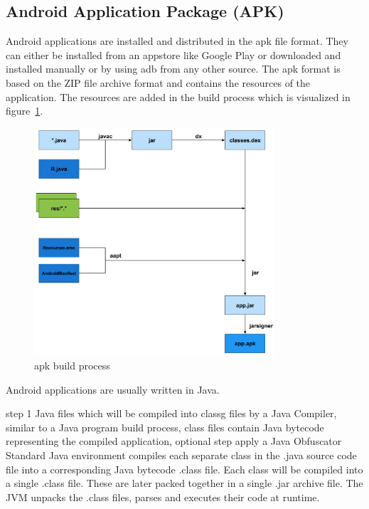 \subsection{Android Application Package (APK)} \label{subsection:foundation-android-package}
Android applications are installed and distributed in the \gls{apk} file format.
They can either be installed from an appstore like Google Play or downloaded and installed manually or by using \gls{adb} from any other source.
\newline
The \gls{apk} format is based on the ZIP file archive format and contains the resources of the application. The resources are added in the build process which is visualized in figure~\ref{fig:apk}.
\begin{figure}[h]
    \centering
    \includegraphics[width=0.8\textwidth]{data/apk.png}
    \caption{\gls{apk} build process \cite{andevconDalvikART}}
    \label{fig:apk}
\end{figure}
\newline
Android applications are usually written in Java.

step 1
Java files which will be compiled into \gls{classg} files by a Java Compiler,  similar to a Java program build process, class files contain Java bytecode representing the compiled application, optional step apply a Java Obfuscator\newline
Standard Java environment compiles each separate class in the .java source code file into a corresponding Java bytecode .class file. Each class will be compiled into a single .class file. These are later packed together in a single .jar archive file. The JVM unpacks the .class files, parses and executes their code at runtime.\newline

